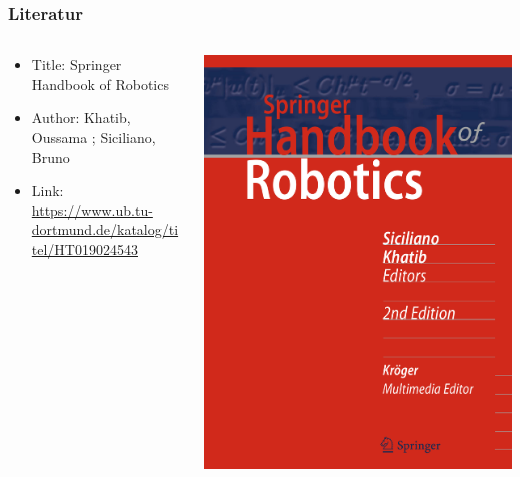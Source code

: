 	\begin{frame}
	\frametitle{Literatur}
	    \begin{columns}[T]
	        \begin{column}{0.49\textwidth}
	            \begin{itemize}%
					\item Title: Springer Handbook of Robotics
					\item Author: Khatib, Oussama ; Siciliano, Bruno
					\item Link: \href{https://www.ub.tu-dortmund.de/katalog/titel/HT019024543}{https://www.ub.tu-dortmund.de/katalog/titel/HT019024543}
	        	\end{itemize}
	        \end{column}
	        \begin{column}{0.49\textwidth}
	        	\centering
	            \includegraphics[scale=0.25]{pictures/springer_robotics.pdf}
	        \end{column}
	    \end{columns}
	\end{frame}


